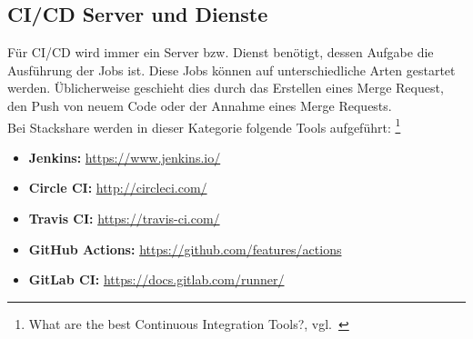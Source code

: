 \newpage
\subsection{CI/CD Server und Dienste}\label{ci_services}

Für CI/CD wird immer ein Server bzw.
Dienst benötigt, dessen Aufgabe die Ausführung der Jobs ist.
Diese Jobs können auf unterschiedliche Arten gestartet werden.
Üblicherweise geschieht dies durch das Erstellen eines Merge Request, den Push von neuem Code oder der Annahme eines Merge Requests. \\

Bei Stackshare werden in dieser Kategorie folgende Tools aufgeführt:
\footnote{What are the best Continuous Integration Tools?, vgl.~\cite{STACKSHARE_CI}}

\begin{itemize}
    \item \textbf{Jenkins:} \href{https://www.jenkins.io/}{https://www.jenkins.io/}
    \item \textbf{Circle CI:} \href{http://circleci.com/}{http://circleci.com/}
    \item \textbf{Travis CI:} \href{https://travis-ci.com/}{https://travis-ci.com/}
    \item \textbf{GitHub Actions:} \href{https://github.com/features/actions}{https://github.com/features/actions}
    \item \textbf{GitLab CI:} \href{https://docs.gitlab.com/runner/}{https://docs.gitlab.com/runner/}
\end{itemize}


